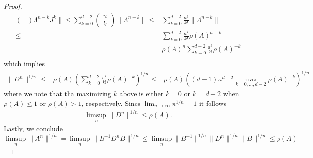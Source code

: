 \begin{proof}
\begin{equation}
\begin{aligned}
\begin{pmatrix}
            \end{pmatrix}\Lambda^{n-k}J^k\|
            \leq \sum_{k=0}^{d-2}
            \begin{pmatrix}
                n\\
                k
            \end{pmatrix}\|\Lambda^{n-k}\|
            \leq& \sum_{k=0}^{d-2} \frac{n^k}{k!}\|\Lambda^{n-k}\|\\
            \leq& \sum_{k=0}^{d-2} \frac{n^k}{k!}\rho(A)^{n-k}\\
            =& \rho(A)^{n}\sum_{k=0}^{d-2} \frac{n^k}{k!}\rho(A)^{-k}\\
        \end{aligned}
    \end{equation}
    which implies
    \begin{equation}
        \begin{aligned}
            \|D^n\|^{1/n}
            \leq& \rho(A)\left(\sum_{k=0}^{d-2} \frac{n^k}{k!}\rho(A)^{-k}\right)^{1/n}
            \leq& \rho(A)\left((d-1)n^{d-2}\max_{k=0,\dots, d-2}\rho(A)^{-k}\right)^{1/n}
        \end{aligned}
    \end{equation}
    where we note that tha maximizing $k$ above is either $k=0$ or $k=d-2$ when $\rho(A)\leq 1$ or $\rho(A)>1$, respectively. Since $\lim_{n\rightarrow \infty} n^{1/n}=1$ it follows \begin{equation}
        \begin{aligned}
            \limsup_n\|D^n\|^{1/n}
            \leq \rho(A).
        \end{aligned}
    \end{equation}
    Lastly, we conclude
    \begin{equation}
        \limsup_n\|A^n\|^{1/n} 
        = \limsup_n \|B^{-1}D^nB\|^{1/n}
        \leq \limsup_n\|B^{-1}\|^{1/n}\|D^n\|^{1/n} \|B\|^{1/n}\leq \rho(A)
    \end{equation}
\end{proof}

